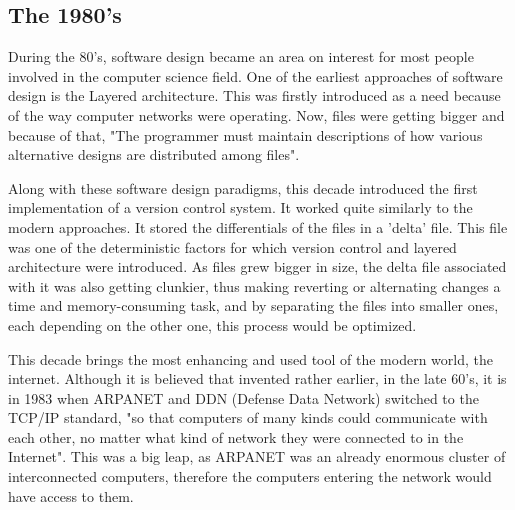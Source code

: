 \subsection{The 1980's}
During the 80's, software design became an area on interest for most people involved in the computer science field.
One of the earliest approaches of software design is the Layered architecture.
This was firstly introduced as a need because of the way computer networks were operating.
Now, files were getting bigger and because of that, "The programmer must maintain descriptions of
how various alternative designs are distributed among files"\cite{layeredArchitecure80s}.

\par
Along with these software design paradigms, this decade introduced the first implementation of a version control system.
It worked quite similarly to the modern approaches.
It stored the differentials of the files in a 'delta' file\cite{layeredArchitecure80s}.
This file was one of the deterministic factors for which version control and layered architecture were introduced.
As files grew bigger in size, the delta file associated with it was also getting clunkier, thus making reverting or alternating changes a time and memory-consuming task, and by separating the files into smaller ones, each depending on the other one, this process would be optimized.

\par
This decade brings the most enhancing and used tool of the modern world, the internet.
Although it is believed that invented rather earlier, in the late 60's, it is in 1983 when ARPANET and DDN (Defense Data Network) switched to the TCP/IP standard, "so that computers of many kinds could communicate with each other, no matter what kind of network they were connected to in the Internet".\cite{arpanetDdn} This was a big leap, as ARPANET was an already enormous cluster of interconnected computers, therefore the computers entering the network would have access to them.

